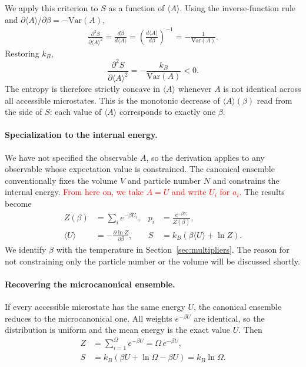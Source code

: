 We apply this criterion to $S$ as a function of $\langle A\rangle$. Using
the inverse-function rule and $\partial\langle A\rangle/\partial\beta=-\mathrm{Var}(A)$,
\begin{align*}
    \frac{\partial^2 S}{\partial\langle A\rangle^2}
    = \frac{d\beta}{d\langle A\rangle}
    = \left(\frac{d\langle A\rangle}{d\beta}\right)^{-1}
    = -\frac{1}{\mathrm{Var}(A)}.
\end{align*}
Restoring $k_B$,
\begin{equation}
    \boxed{\frac{\partial^2 S}{\partial\langle A\rangle^2}
    = -\frac{k_B}{\mathrm{Var}(A)}<0.}
\end{equation}
The entropy is therefore strictly concave in $\langle A\rangle$ whenever $A$
is not identical across all accessible microstates. This is the monotonic
decrease of $\langle A\rangle(\beta)$ read from the side of $S$: each value
of $\langle A\rangle$ corresponds to exactly one $\beta$.

\paragraph{Specialization to the internal energy.}
We have not specified the observable $A$, so the derivation applies to any
observable whose expectation value is constrained. The canonical ensemble
conventionally fixes the volume $V$ and particle number $N$ and constrains
the internal energy. \textcolor{red}{From here on, we take $A=U$ and write
$U_i$ for $a_i$.} The results become
\begin{equation}
    \boxed{
    \begin{aligned}
        Z(\beta) &= \sum_i e^{-\beta U_i}, &
        p_i &= \frac{e^{-\beta U_i}}{Z(\beta)}, \\
        \langle U\rangle &= -\frac{\partial\ln Z}{\partial\beta}, &
        S &= k_B\left(\beta\langle U\rangle+\ln Z\right).
    \end{aligned}}
\end{equation}
We identify $\beta$ with the temperature in Section~\ref{sec:multipliers}.
The reason for not constraining only the particle number or the volume will
be discussed shortly.

\paragraph{Recovering the microcanonical ensemble.}
If every accessible microstate has the same energy $U$, the canonical
ensemble reduces to the microcanonical one. All weights $e^{-\beta U}$ are
identical, so the distribution is uniform and the mean energy is the exact
value $U$. Then
\begin{align*}
    Z &= \sum_{i=1}^{\Omega} e^{-\beta U} = \Omega\, e^{-\beta U}, \\
    S &= k_B\left(\beta U+\ln\Omega-\beta U\right) = k_B\ln\Omega.
\end{align*}

